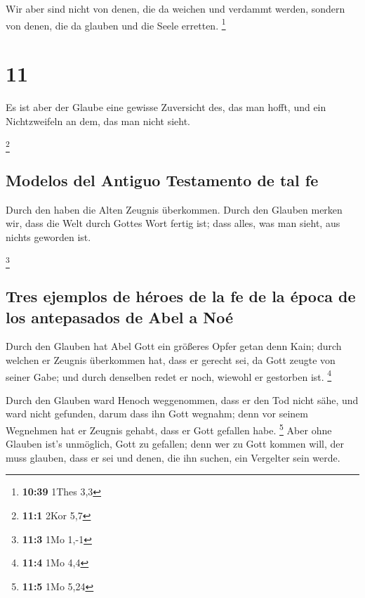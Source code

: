  Wir aber sind nicht von denen, die da weichen und
verdammt werden, sondern von denen, die da glauben und die Seele
erretten. \footnote{\textbf{10:39} 1Thes 3,3}

\hypertarget{section-10}{%
\section{11}\label{section-10}}

 Es ist aber der Glaube eine gewisse Zuversicht des, das
man hofft, und ein Nichtzweifeln an dem, das man nicht sieht.

\footnote{\textbf{11:1} 2Kor 5,7}

\hypertarget{modelos-del-antiguo-testamento-de-tal-fe}{%
\subsection{Modelos del Antiguo Testamento de tal
fe}\label{modelos-del-antiguo-testamento-de-tal-fe}}

 Durch den haben die Alten Zeugnis überkommen.
 Durch den Glauben merken wir, dass die Welt durch Gottes
Wort fertig ist; dass alles, was man sieht, aus nichts geworden ist.

\footnote{\textbf{11:3} 1Mo 1,-1}

\hypertarget{tres-ejemplos-de-huxe9roes-de-la-fe-de-la-uxe9poca-de-los-antepasados-de-abel-a-nouxe9}{%
\subsection{Tres ejemplos de héroes de la fe de la época de los
antepasados \hspace{0pt}\hspace{0pt}de Abel a
Noé}\label{tres-ejemplos-de-huxe9roes-de-la-fe-de-la-uxe9poca-de-los-antepasados-de-abel-a-nouxe9}}

 Durch den Glauben hat Abel Gott ein größeres Opfer getan
denn Kain; durch welchen er Zeugnis überkommen hat, dass er gerecht sei,
da Gott zeugte von seiner Gabe; und durch denselben redet er noch,
wiewohl er gestorben ist. \footnote{\textbf{11:4} 1Mo 4,4}

 Durch den Glauben ward Henoch weggenommen, dass er den
Tod nicht sähe, und ward nicht gefunden, darum dass ihn Gott wegnahm;
denn vor seinem Wegnehmen hat er Zeugnis gehabt, dass er Gott gefallen
habe. \footnote{\textbf{11:5} 1Mo 5,24}  Aber ohne Glauben
ist's unmöglich, Gott zu gefallen; denn wer zu Gott kommen will, der
muss glauben, dass er sei und denen, die ihn suchen, ein Vergelter sein
werde.

